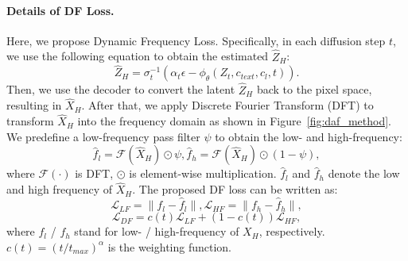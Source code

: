 \paragraph{Details of DF Loss.}
Here, we propose Dynamic Frequency Loss. 
Specifically, in each diffusion step $t$, we use the following equation to obtain the estimated $\hat{Z}_H$:
\begin{equation}
    \hat{Z}_H = \sigma_t^{-1}(\alpha_t\epsilon-\phi_\theta(Z_t, c_{text}, c_{l}, t)).
\end{equation}
Then, we use the decoder to convert the latent $\hat{Z}_H$ back to the pixel space, resulting in $\hat{X}_H$. After that, we apply Discrete Fourier Transform (DFT) to transform $\hat{X}_H$ into the frequency domain as shown in Figure~\ref{fig:daf_method}. 
We predefine a low-frequency pass filter $\psi$ to obtain the low- and high-frequency: %
\begin{equation}
    \hat{f}_l = \mathcal{F}(\hat{X}_H) \odot \psi, \hat{f}_h = \mathcal{F}(\hat{X}_H) \odot (1-\psi),
\end{equation}
where $\mathcal{F}(\cdot)$ is DFT, $\odot$ is element-wise multiplication. $\hat{f}_{l}$ and $\hat{f}_{h}$ denote the low and high frequency of $\hat{X}_H$. The proposed DF loss can be written as: 
\begin{equation}
    \mathcal{L}_{LF} = \| f_l - \hat{f}_l \|, \mathcal{L}_{HF} = \| f_h - \hat{f}_h \|,
\end{equation}
\begin{equation}
    \mathcal{L}_{DF} = c(t)\mathcal{L}_{LF} + (1-c(t))\mathcal{L}_{HF},
\end{equation}
where $f_l$ / $f_h$ stand for low- / high-frequency of $X_H$, respectively. $c(t) = (t/t_{max})^\alpha$ is the weighting function.